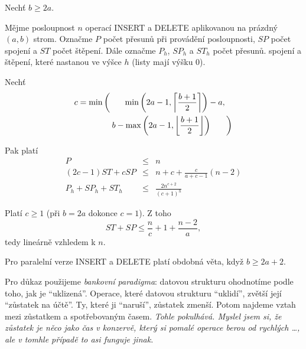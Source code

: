 Nechť $b \geq 2a$.
\begin{theorem}
Mějme posloupnost $n$ operací INSERT a DELETE aplikovanou na prázdný
$(a,b)$ strom. Označme $P$ počet přesunů při provádění posloupnosti,
$SP$ počet spojení a $ST$ počet štěpení. Dále označme $P_h$, $SP_h$ a
$ST_h$ počet přesunů. spojení a štěpení, které nastanou ve výšce $h$
(listy mají výšku 0).

Nechť
\begin{equation}
\begin{split}
c = \min
 &\left(
   \phantom{b - \vphantom{x}}
        \min \left( 2a-1, \left\lceil \frac{b+1}{2}\right\rceil  \right) - a, 
  \right.\\
 &\left.
		\phantom{\left(
		\vphantom{\left. \frac xy\right.}
		\right.}
    b - \max \left( 2a-1, \left\lfloor\frac{b+1}{2}\right\rfloor \right)
   \phantom{\vphantom{x} - a}
  \right)
\end{split}
\end{equation}

Pak platí
\begin{eqnarray}
P &\leq& n \\
\label{ab-v-stsp}
(2c-1)ST + cSP &\leq& n + c + \frac c{a+c-1} (n-2) \\
\label{ab-v-sthsph}
P_h + SP_h + ST_h &\leq& \frac{2 n^{c+2}}{(c+1)^h} 
\end{eqnarray}
\end{theorem}

Platí $c \geq 1$ (při $b = 2a$ dokonce $c = 1$). Z toho
\begin{equation}
ST + SP \leq \frac nc + 1 + \frac{n-2}a,
\end{equation}
tedy lineárně vzhledem k $n$.

Pro paralelní verze INSERT a DELETE platí obdobná věta, když 
$b \geq 2a + 2$.

Pro důkaz použijeme \emph{bankovní paradigma}: datovou strukturu
ohodnotíme podle toho, jak je ``uklizená''. Operace, které datovou
strukturu ``uklidí'', zvětší její ``zůstatek na účtě''. Ty, které ji
``naruší'', zůstatek zmenší. Potom najdeme vztah mezi zůstatkem a
spotřebovaným časem.
{\it Tohle pokulhává. Myslel jsem si, že zůstatek je něco jako čas v
konzervě, který si pomalé operace berou od rychlých \dots, ale  v
tomhle případě to asi funguje jinak.}

